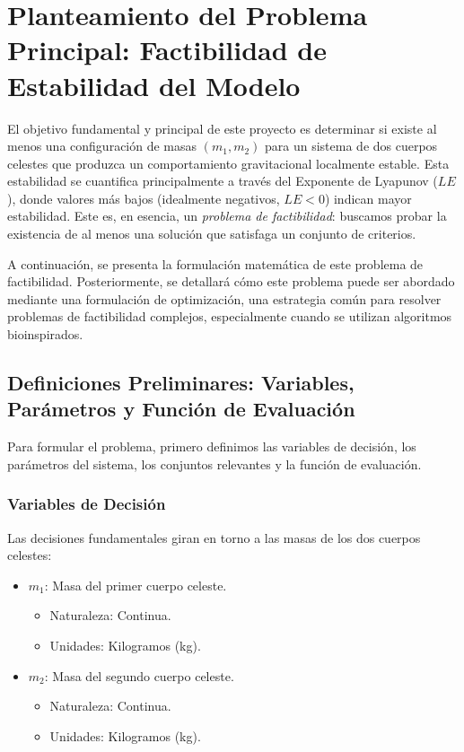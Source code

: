 \section[Planteamiento del Problema de Factibilidad]{Planteamiento del Problema Principal: Factibilidad de Estabilidad del Modelo}%
\label{sec:problema_principal_factibilidad}

El objetivo fundamental y principal de este proyecto es determinar si existe al menos una configuración de masas $(m_1, m_2)$ para un sistema de dos cuerpos celestes que produzca un comportamiento gravitacional localmente estable. Esta estabilidad se cuantifica principalmente a través del Exponente de Lyapunov ($LE$), donde valores más bajos (idealmente negativos, $LE < 0$) indican mayor estabilidad. Este es, en esencia, un \textit{problema de factibilidad}: buscamos probar la existencia de al menos una solución que satisfaga un conjunto de criterios.

A continuación, se presenta la formulación matemática de este problema de factibilidad. Posteriormente, se detallará cómo este problema puede ser abordado mediante una formulación de optimización, una estrategia común para resolver problemas de factibilidad complejos, especialmente cuando se utilizan algoritmos bioinspirados.

\subsection{Definiciones Preliminares: Variables, Parámetros y Función de Evaluación}%
\label{subsec:definiciones_preliminares}

Para formular el problema, primero definimos las variables de decisión, los parámetros del sistema, los conjuntos relevantes y la función de evaluación.

\subsubsection{Variables de Decisión}%
\label{ssubsec:variables_decision}
Las decisiones fundamentales giran en torno a las masas de los dos cuerpos celestes:
\begin{itemize}
    \item $m_1$: Masa del primer cuerpo celeste.
    \begin{itemize}
        \item Naturaleza: Continua.
        \item Unidades: Kilogramos (kg).
    \end{itemize}
    \item $m_2$: Masa del segundo cuerpo celeste.
    \begin{itemize}
        \item Naturaleza: Continua.
        \item Unidades: Kilogramos (kg).
    \end{itemize}
\end{itemize}

